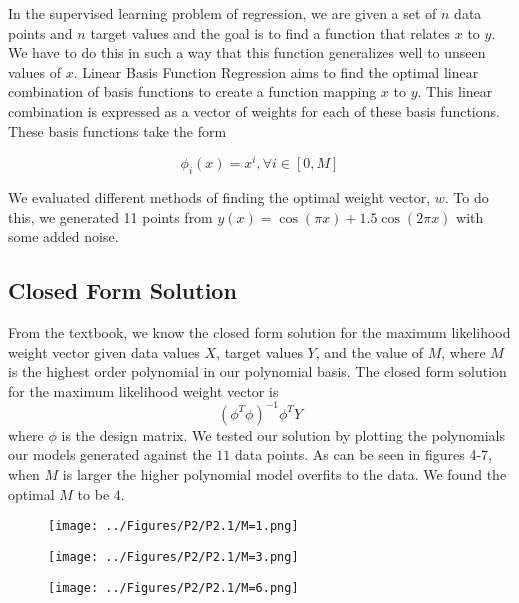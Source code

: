 \documentclass[a4paper,twoside]{article}
\begin{document}
In the supervised learning problem of regression, we are given a set of $n$ data points and $n$ target values and the goal is to find a function that relates $x$ to $y$. We have to do this in such a way that this function generalizes well to unseen values of $x$. Linear Basis Function Regression aims to find the optimal linear combination of basis functions to create a function mapping $x$ to $y$. This linear combination is expressed as a vector of weights for each of these basis functions. These basis functions take the form

\begin{equation}
\phi_i(x) = x^i,  \forall i \in [0,M]
\end{equation}

We evaluated different methods of finding the optimal weight vector, $w$. To do this, we generated 11 points from $y(x) = \cos(\pi x)+1.5 \cos(2 \pi x)$ with some added noise. 

\subsection{Closed Form Solution}

From the textbook, we know the closed form solution for the maximum likelihood weight vector given data values $X$, target values $Y$, and the value of $M$, where $M$ is the highest order polynomial in our polynomial basis. The closed form solution for the maximum likelihood weight vector is
\begin{equation}
(\phi^T \phi)^{-1} \phi^T Y
\end{equation}
where $\phi$ is the design matrix. We tested our solution by plotting the polynomials our models generated against the $11$ data points. As can be seen in figures 4-7, when $M$ is larger the higher polynomial model overfits to the data. We found the optimal $M$ to be $4$.

\begin{figure}[h]
  \texttt{[image: ../Figures/P2/P2.1/M=1.png]}
  \caption{}
  \label{fig:gradient_converging}
\end{figure}

\begin{figure}[h]
  \texttt{[image: ../Figures/P2/P2.1/M=3.png]}
  \caption{}
  \label{fig:gradient_converging}
\end{figure}

\begin{figure}[h]
  \texttt{[image: ../Figures/P2/P2.1/M=6.png]}
  \caption{}
  \label{fig:gradient_converging}
\end{figure}
\end{document}
